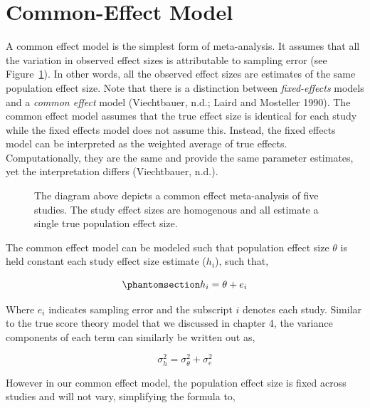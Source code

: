 \documentclass[
  letterpaper,
  DIV=11,
  numbers=noendperiod]{scrreprt}
\begin{document}
\section{Common-Effect Model}\label{common-effect-model}

A common effect model is the simplest form of meta-analysis. It assumes
that all the variation in observed effect sizes is attributable to
sampling error (see Figure~\ref{fig-common-effect}). In other words, all
the observed effect sizes are estimates of the same population effect
size. Note that there is a distinction between \emph{fixed-effects}
models and a \emph{common effect} model (Viechtbauer, n.d.; Laird and
Mosteller 1990). The common effect model assumes that the true effect
size is identical for each study while the fixed effects model does not
assume this. Instead, the fixed effects model can be interpreted as the
weighted average of true effects. Computationally, they are the same and
provide the same parameter estimates, yet the interpretation differs
(Viechtbauer, n.d.).

\begin{figure}[H]


\caption{\label{fig-common-effect}The diagram above depicts a common
effect meta-analysis of five studies. The study effect sizes are
homogenous and all estimate a single true population effect size.}

\end{figure}%

The common effect model can be modeled such that population effect size
\(\theta\) is held constant each study effect size estimate (\(h_i\)),
such that,

\begin{equation}\phantomsection\label{eq-fixed-mdl}{
h_i  = \theta + e_i
}\end{equation}

Where \(e_i\) indicates sampling error and the subscript \(i\) denotes
each study. Similar to the true score theory model that we discussed in
chapter 4, the variance components of each term can similarly be written
out as,

\[
\sigma^2_h = \sigma^2_\theta + \sigma^2_e
\]

However in our common effect model, the population effect size is fixed
across studies and will not vary, simplifying the formula to,
\end{document}
